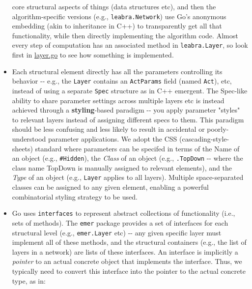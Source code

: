 \begin{itemize}
  core structural aspects of things (data structures etc), and then the
  algorithm-specific versions (e.g., \texttt{leabra.Network}) use Go's
  anonymous embedding (akin to inheritance in C++) to transparently get
  all that functionality, while then directly implementing the algorithm
  code. Almost every step of computation has an associated method in
  \texttt{leabra.Layer}, so look first in
  \href{https://github.com/emer/leabra/blob/master/leabra/layer.go}{layer.go}
  to see how something is implemented.
\item
  Each structural element directly has all the parameters controlling
  its behavior -\/- e.g., the \texttt{Layer} contains an
  \texttt{ActParams} field (named \texttt{Act}), etc, instead of using a
  separate \texttt{Spec} structure as in C++ emergent. The Spec-like
  ability to share parameter settings across multiple layers etc is
  instead achieved through a \textbf{styling}-based paradigm -\/- you
  apply parameter "styles" to relevant layers instead of assigning
  different specs to them. This paradigm should be less confusing and
  less likely to result in accidental or poorly-understood parameter
  applications. We adopt the CSS (cascading-style-sheets) standard where
  parameters can be specifed in terms of the Name of an object (e.g.,
  \texttt{\#Hidden}), the \emph{Class} of an object (e.g.,
  \texttt{.TopDown} -\/- where the class name TopDown is manually
  assigned to relevant elements), and the \emph{Type} of an object
  (e.g., \texttt{Layer} applies to all layers). Multiple space-separated
  classes can be assigned to any given element, enabling a powerful
  combinatorial styling strategy to be used.
\item
  Go uses \texttt{interfaces} to represent abstract collections of
  functionality (i.e., sets of methods). The \texttt{emer} package
  provides a set of interfaces for each structural level (e.g.,
  \texttt{emer.Layer} etc) -\/- any given specific layer must implement
  all of these methods, and the structural containers (e.g., the list of
  layers in a network) are lists of these interfaces. An interface is
  implicitly a \emph{pointer} to an actual concrete object that
  implements the interface. Thus, we typically need to convert this
  interface into the pointer to the actual concrete type, as in:
\end{itemize}

